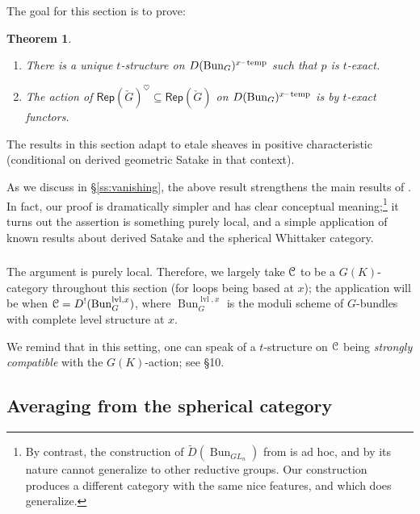 \documentclass[reqno,11pt]{amsart}
\numberwithin{equation}{subsection}
\newtheorem{thm}{Theorem}[subsubsection]
\theoremstyle{remark}
\newcommand{\sC}{{\EuScript C}}
\newcommand{\on}{\operatorname}
\newcommand{\mathendash}{\text{\textendash}}
\newcommand{\Rep}{\mathsf{Rep}}
\newcommand{\Bun}{\on{Bun}}
\newcommand{\heart}{\heartsuit}
\renewcommand{\subset}{\subseteq}
\newcommand{\xtemp}{x\mathendash\on{temp}}
\newcommand{\xlevel}{\on{lvl},x}
\begin{document}
The goal for this section is to prove:

\begin{thm}\label{t:hecke-exact}

\begin{enumerate}

\item There is a unique $t$-structure on $D(\Bun_G)^{\xtemp}$ such that 
$p$ is $t$-exact. 

\item The action of $\Rep(\check{G})^{\heart} \subset \Rep(\check{G})$ 
on $D(\Bun_G)^{\xtemp}$ is by $t$-exact functors. 

\end{enumerate}

\end{thm} 

The results in this section adapt to etale sheaves in positive characteristic
(conditional on derived geometric Satake in that context).

As we discuss in \S \ref{ss:vanishing}, the above result
strengthens the main results of \cite{vanishing}. In fact, our proof 
is dramatically simpler and has clear conceptual meaning;\footnote{By contrast,
the construction of 
$\widetilde{D}(\Bun_{GL_n})$ from \cite{vanishing} is ad hoc, and by its
nature cannot generalize to other reductive groups. Our construction 
produces a different category with the same nice features, and which 
does generalize.}
it turns out the assertion is something purely local, and 
a simple application of known results about derived Satake and the
spherical Whittaker category.

\subsubsection{}

The argument is purely local. Therefore, we largely take
$\sC$ to be a $G(K)$-category throughout this section
(for loops being based at $x$); the application will be
when $\sC = D^!(\Bun_G^{\xlevel})$, where 
$\Bun_G^{\xlevel}$ is the moduli scheme of
$G$-bundles with complete level structure at $x$.

We remind that in this setting, one can speak of a $t$-structure on $\sC$
being \emph{strongly compatible} with the $G(K)$-action; 
see \cite{methods} \S 10. 

\subsection{Averaging from the spherical category}
\end{document}
